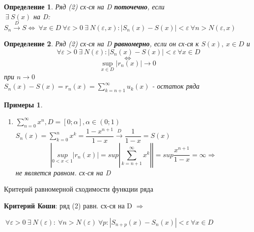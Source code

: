 \documentclass[a4paper, 12pt]{article}
\newtheorem{Definition}{Определение}
\newtheorem{Examples}{Примеры}
\begin{document}
    \begin{Definition}
        Ряд (2) сх-ся на D \textbf{поточечно}, если \\
         $\ \exists \  S(x)$ на D: $S_n \xrightarrow{D} S \Leftrightarrow
         \ \forall x \in D \ \forall \varepsilon > 0 \ \exists
         \ N(\varepsilon, x): \left| S_n(x) - S(x) \right| < \varepsilon
         \ \forall n > N(\varepsilon, x)$
    \end{Definition}
    \begin{Definition}
        Ряд (2) сх-ся на D \textbf{равномерно}, если он сх-ся к $S(x),
        \ x \in D$ и\\
        \[\ \forall \varepsilon > 0 \ \exists \  N(\varepsilon):
        \left| S_n(x) - S(x)\right| < \varepsilon \ \forall x \in D \]
        \[\Leftrightarrow\]
        \[\underset{x \in D}{\sup} \left|r_n(x) \right| \rightarrow 0\]
        при $n \rightarrow 0$ \\ 
        $S_n(x) - S(x) = r_n(x) = \displaystyle
        \sum^{\infty}_{k = n + 1} u_k(x)$  - остаток ряда
    \end{Definition}
    \begin{Examples}
        \leavevmode
        \begin{enumerate}
            \item
            $\displaystyle \sum ^{\infty}_{n = 0}x^n, D = [0; \alpha],
            \alpha \in (0; 1)$ \\
            $S_n(x) = \displaystyle \sum ^{n}_{k = 0} x^k =
            \dfrac{1 - x^{n + 1}}{1 - x} \xrightarrow{D} \dfrac{1}{1 - x} = S(x)$
            \[ \left| \underset{0 < x < 1}{sup} |r_n(x)| =  sup \left|
            \displaystyle \sum^{\infty}_{k = n + 1} x^k \right| \right| =
            sup \dfrac{x^{ n + 1}}{1 - x} = \infty \Rightarrow\]
            не является равном. сх-ся на D
        \end{enumerate}
    \end{Examples}

    \vspace{1cm}
    Критерий равномерной сходимости функции ряда

    \begin{flushleft}
    \textbf{Критерий Коши}: ряд (2) равн. сх-ся на D $\Rightarrow$\\
        
    \end{flushleft}
    $\ \forall \varepsilon > 0 \ \exists \  N(\varepsilon):
    \ \forall n > N(\varepsilon) \ \forall p:
    \left| S_{n + p}(x) - S_n(x) \right| < \varepsilon \ \forall x \in D$
\end{document}
